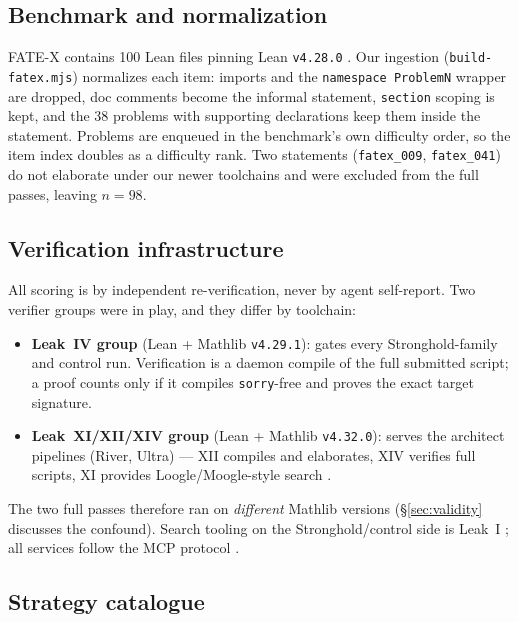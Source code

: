 \documentclass[12pt, a4paper]{article}
\newcommand{\run}[1]{\texttt{#1}}
\begin{document}
\subsection{Benchmark and normalization}
\label{sec:benchmark}

FATE-X contains 100 Lean files pinning Lean \texttt{v4.28.0} \cite{fatex2025}.
Our ingestion (\run{build-fatex.mjs}) normalizes each item: imports and the
\texttt{namespace ProblemN} wrapper are dropped, doc comments become the
informal statement, \texttt{section} scoping is kept, and the 38 problems with
supporting declarations keep them inside the statement. Problems are enqueued
in the benchmark's own difficulty order, so the item index doubles as a
difficulty rank. Two statements (\run{fatex\_009}, \run{fatex\_041}) do not
elaborate under our newer toolchains and were excluded from the full passes,
leaving $n=98$.

\subsection{Verification infrastructure}
\label{sec:verifiers}

All scoring is by independent re-verification, never by agent self-report.
Two verifier groups were in play, and they differ by toolchain:

\begin{itemize}[itemsep=1pt]
  \item \textbf{Leak~IV group} (Lean + Mathlib \texttt{v4.29.1}): gates every
        Stronghold-family and control run. Verification is a daemon compile of
        the full submitted script; a proof counts only if it compiles
        \texttt{sorry}-free and proves the exact target signature.
  \item \textbf{Leak~XI/XII/XIV group} (Lean + Mathlib \texttt{v4.32.0}):
        serves the architect pipelines (River, Ultra) --- XII compiles and
        elaborates, XIV verifies full scripts, XI provides Loogle/Moogle-style
        search \cite{loogle,moogle}.
\end{itemize}

\noindent
The two full passes therefore ran on \emph{different} Mathlib versions
(\S\ref{sec:validity} discusses the confound). Search tooling on the
Stronghold/control side is Leak~I \cite{loogle}; all services follow the
MCP protocol \cite{anthropic2024mcp}.

\subsection{Strategy catalogue}
\label{sec:strategies}
\end{document}
